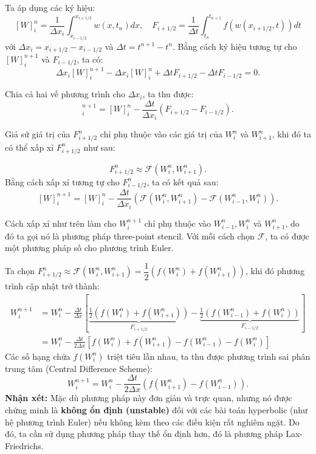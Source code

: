 Ta áp dụng các ký hiệu:
\[
[W]_i^n = \dfrac{1}{\Delta x_i}\int_{x_{i-1/2}}^{x_{i+1/2}} w(x, t_n) dx, \quad F_{i+1/2} = \dfrac{1}{\Delta t}\int_{t_n}^{t_{n+1}} f(w(x_{i+1/2}, t)) dt
\]
với $\Delta x_i = x_{i+1/2} - x_{i-1/2}$ và $\Delta t = t^{n+1} - t^n$. Bằng cách ký hiệu tương tự cho $[W]_i^{n+1}$ và $F_{i-1/2}$, ta có:
$$
\Delta x_i [W]_i^{n+1} - \Delta x_i [W]_i^n + \Delta t F_{i+1/2} - \Delta t F_{i-1/2} = 0.
$$

Chia cả hai vế phương trình cho $\Delta x_i$, ta thu được:
\begin{equation*}
    [W]_i^{n+1} = [W]_i^n - \frac{\Delta t}{\Delta x_i} \left( F_{i+1/2} - F_{i-1/2} \right).
\end{equation*}

Giả sử giá trị của $F^n_{i+1/2}$ chỉ phụ thuộc vào các giá trị của $W_i^n$ và $W_{i+1}^{n}$, khi đó ta có thể xấp xỉ $F^n_{i+1/2}$ như sau:

\[
F^n_{i+1/2} \approx \mathcal{F} (W_i^n, W^n_{i+1}).
\]
Bằng cách xấp xỉ tương tự cho $F^n_{i-1/2}$, ta có kết quả sau:
\[
[W]_i^{n+1} = [W]_i^n - \frac{\Delta t}{\Delta x_i} \left( \mathcal{F} (W_i^n, W^n_{i+1}) - \mathcal{F} (W_{i-1}^n, W^n_{i})\right).
\]

Cách xấp xỉ như trên làm cho $W_i^{n+1}$ chỉ phụ thuộc vào $W_{i-1}^{n}, W_i^{n}$ và $W_{i+1}^{n}$, do đó ta gọi nó là phương pháp three-point stencil. Với mỗi cách chọn $\mathcal{F}$, ta có được một phương pháp số cho phương trình Euler.

Ta chọn $F^n_{i+1/2} \approx \mathcal{F} (W_i^n, W^n_{i+1}) = \dfrac{1}{2}(f(W_i^n) + f(W_{i+1}^n))$, khi đó phương trình cập nhật trở thành:
\begin{align*}
    W_i^{n+1} &= W_i^n - \frac{\Delta t}{\Delta x} \left[ \underbrace{\frac{1}{2}(f(W_i^n) + f(W_{i+1}^n))}_{F_{i+1/2}} - \underbrace{\frac{1}{2}(f(W_{i-1}^n) + f(W_i^n))}_{F_{i-1/2}} \right] \\
    &= W_i^n - \frac{\Delta t}{2\Delta x} \left[ f(W_i^n) + f(W_{i+1}^n) - f(W_{i-1}^n) - f(W_i^n) \right]
\end{align*}
Các số hạng chứa $f(W_i^n)$ triệt tiêu lẫn nhau, ta thu được phương trình sai phân trung tâm (Central Difference Scheme):
\begin{equation*}
    W_i^{n+1} = W_i^n - \frac{\Delta t}{2\Delta x} \left( f(W_{i+1}^n) - f(W_{i-1}^n) \right).
\end{equation*}
\textbf{Nhận xét:} Mặc dù phương pháp này đơn giản và trực quan, nhưng nó được chứng minh là \textbf{không ổn định (unstable)} đối với các bài toán hyperbolic (như hệ phương trình Euler) nếu không kèm theo các điều kiện rất nghiêm ngặt. Do đó, ta cần sử dụng phương pháp thay thế ổn định hơn, đó là phương pháp Lax-Friedrichs.
